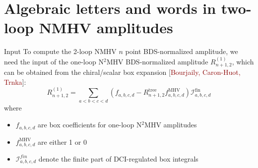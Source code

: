 \documentclass[10pt]{beamer}
\begin{document}


\section{Algebraic letters and words in two-loop NMHV amplitudes}

\begin{frame}[t]{Input}
To compute the 2-loop NMHV $n$ point BDS-normalized amplitude, we need the input of the one-loop N$^{2}$MHV BDS-normalized amplitude $R_{n+1,2}^{(1)}$, which can be obtained from the chiral/scalar box expansion {\footnotesize[\textcolor{darkred}{Bourjaily, Caron-Huot, Trnka}]}:
\begin{equation*}
  R_{n+1,2}^{(1)} =\sum_{a<b<c<d} (f_{a,b,c,d}-R_{n+1,2}^{\text{tree}} f_{a,b,c,d}^{\text{MHV}})\mathcal{I}_{a,b,c,d}^{\text{fin}}
\end{equation*}
where
\begin{itemize}
  \item $f_{a,b,c,d}$ are box coefficients for one-loop N$^{2}$MHV amplitudes
  \item $f_{a,b,c,d}^{\text{MHV}}$ are either 1 or 0
  \item $\mathcal{I}_{a,b,c,d}^{fin}$ denote the finite part of DCI-regulated box integrals
\end{itemize}

\end{frame}
\end{document}

